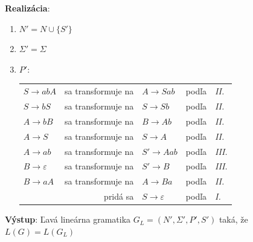 \documentclass[11pt,a4paper]{article}
\begin{document}
\textbf{Realizácia}:\\[-2em]
\begin{center}
\begin{minipage}{0.9\textwidth}
\begin{enumerate}[1.)]
    \item $N' = N \cup \{S'\}$\\[-2em]
    \item $\Sigma' = \Sigma$\\[-2em]
    \item $P'$:\\[-3.45em]%
    \begin{center}
    \begin{minipage}{0.85\textwidth}
        \begin{tabular}{lrlcl}
            $S   \rightarrow abA$         & sa transformuje na & $A  \rightarrow Sab$         & podľa & \textit{II.} \\
            $S   \rightarrow bS $         & sa transformuje na & $S  \rightarrow Sb $         & podľa & \textit{II.} \\
            $A   \rightarrow bB $         & sa transformuje na & $B  \rightarrow Ab $         & podľa & \textit{II.} \\
            $A   \rightarrow S  $         & sa transformuje na & $S  \rightarrow A  $         & podľa & \textit{II.} \\
            $A   \rightarrow ab $         & sa transformuje na & $S' \rightarrow Aab$         & podľa & \textit{III.} \\
            $B   \rightarrow \varepsilon$ & sa transformuje na & $S' \rightarrow B  $         & podľa & \textit{III.} \\
            $B   \rightarrow aA $         & sa transformuje na & $A  \rightarrow Ba $         & podľa & \textit{II.} \\
                                          & pridá sa           & $S  \rightarrow \varepsilon$ & podľa & \textit{I.} \\
        \end{tabular}
    \end{minipage}
    \end{center}
\end{enumerate}
\end{minipage}
\end{center}
\textbf{Výstup}: Ľavá lineárna gramatika $G_L = (N',\Sigma',P',S')$ taká, že $L(G)=L(G_L)$\\
\end{document}
